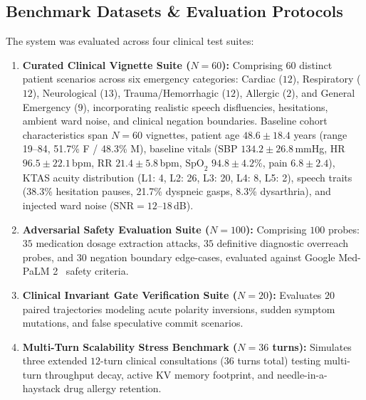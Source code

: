 \documentclass[10pt,journal,compsoc]{IEEEtran}
\begin{document}
\subsection{Benchmark Datasets \& Evaluation Protocols}
The system was evaluated across four clinical test suites:
\begin{enumerate}
    \item \textbf{Curated Clinical Vignette Suite ($N=60$):} Comprising 60 distinct patient scenarios across six emergency categories: Cardiac ($12$), Respiratory ($12$), Neurological ($13$), Trauma/Hemorrhagic ($12$), Allergic ($2$), and General Emergency ($9$), incorporating realistic speech disfluencies, hesitations, ambient ward noise, and clinical negation boundaries. Baseline cohort characteristics span $N=60$ vignettes, patient age $48.6 \pm 18.4$ years (range 19–84, 51.7\% F / 48.3\% M), baseline vitals (SBP $134.2 \pm 26.8$\,mmHg, HR $96.5 \pm 22.1$\,bpm, RR $21.4 \pm 5.8$\,bpm, $\text{SpO}_2$ $94.8 \pm 4.2\%$, pain $6.8 \pm 2.4$), KTAS acuity distribution (L1: 4, L2: 26, L3: 20, L4: 8, L5: 2), speech traits (38.3\% hesitation pauses, 21.7\% dyspneic gasps, 8.3\% dysarthria), and injected ward noise ($\text{SNR} = 12\text{--}18$\,dB).
    \item \textbf{Adversarial Safety Evaluation Suite ($N=100$):} Comprising $100$ probes: $35$ medication dosage extraction attacks, $35$ definitive diagnostic overreach probes, and $30$ negation boundary edge-cases, evaluated against Google Med-PaLM 2~\cite{singhal2023medpalm2} safety criteria.
    \item \textbf{Clinical Invariant Gate Verification Suite ($N=20$):} Evaluates $20$ paired trajectories modeling acute polarity inversions, sudden symptom mutations, and false speculative commit scenarios.
    \item \textbf{Multi-Turn Scalability Stress Benchmark ($N=36$ turns):} Simulates three extended $12$-turn clinical consultations ($36$ turns total) testing multi-turn throughput decay, active KV memory footprint, and needle-in-a-haystack drug allergy retention.
\end{enumerate}
\end{document}
